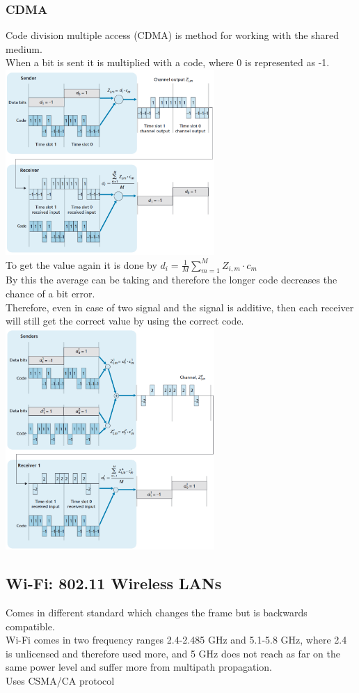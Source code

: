 \documentclass[12pt, a4paper]{article}
\begin{document}
			\subsubsection{CDMA}
				Code division multiple access (CDMA) is method for working with the shared medium.\\
				When a bit is sent it is multiplied with a code, where 0 is represented as -1.\\
				\includegraphics[width=300px]{assets/CDMA.png}\\
				To get the value again it is done by $d_i=\frac{1}{M}\sum\limits_{m=1}^MZ_{i,m}\cdot c_m$\\
				By this the average can be taking and therefore the longer code decreases the chance of a bit error.\\
				Therefore, even in case of two signal and the signal is additive, then each receiver will still get the correct value by using the correct code.\\
				\includegraphics[width=300px]{assets/CDMAInter.png}\\
		\subsection{Wi-Fi: 802.11 Wireless LANs}
			Comes in different standard which changes the frame but is backwards compatible.\\
			Wi-Fi comes in two frequency ranges 2.4-2.485 GHz and 5.1-5.8 GHz, where 2.4 is unlicensed and therefore used more, and 5 GHz does not reach as far on the same power level and suffer more from multipath propagation.\\
			Uses CSMA/CA protocol
\end{document}
